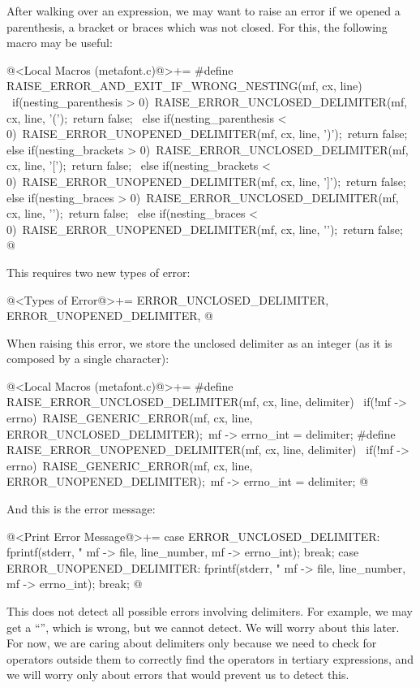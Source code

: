 After walking over an expression, we may want to raise an error if we
opened a parenthesis, a bracket or braces which was not closed. For
this, the following macro may be useful:

\iniciocodigo
@<Local Macros (metafont.c)@>+=
#define RAISE_ERROR_AND_EXIT_IF_WRONG_NESTING(mf, cx, line) {\
  if(nesting_parenthesis > 0){\
    RAISE_ERROR_UNCLOSED_DELIMITER(mf, cx, line, '(');\
    return false;\
  } else if(nesting_parenthesis < 0){\
    RAISE_ERROR_UNOPENED_DELIMITER(mf, cx, line, ')');\
    return false;\
  } else if(nesting_brackets > 0){\
    RAISE_ERROR_UNCLOSED_DELIMITER(mf, cx, line, '[');\
    return false;\
  } else if(nesting_brackets < 0){\
    RAISE_ERROR_UNOPENED_DELIMITER(mf, cx, line, ']');\
    return false;\
  } else if(nesting_braces > 0){\
    RAISE_ERROR_UNCLOSED_DELIMITER(mf, cx, line, '{');\
    return false;\
  } else if(nesting_braces < 0){\
    RAISE_ERROR_UNOPENED_DELIMITER(mf, cx, line, '}');\
    return false;}}
@
\fimcodigo

This requires two new types of error:

\iniciocodigo
@<Types of Error@>+=
ERROR_UNCLOSED_DELIMITER, ERROR_UNOPENED_DELIMITER,
@
\fimcodigo

When raising this error, we store the unclosed delimiter as an integer
(as it is composed by a single character):

\iniciocodigo
@<Local Macros (metafont.c)@>+=
#define RAISE_ERROR_UNCLOSED_DELIMITER(mf, cx, line, delimiter) {\
  if(!mf -> errno){\
    RAISE_GENERIC_ERROR(mf, cx, line, ERROR_UNCLOSED_DELIMITER);\
    mf -> errno_int = delimiter;}}
#define RAISE_ERROR_UNOPENED_DELIMITER(mf, cx, line, delimiter) {\
  if(!mf -> errno){\
    RAISE_GENERIC_ERROR(mf, cx, line, ERROR_UNOPENED_DELIMITER);\
    mf -> errno_int = delimiter;}}
@
\fimcodigo

And this is the error message:

\iniciocodigo
@<Print Error Message@>+=
case ERROR_UNCLOSED_DELIMITER:
  fprintf(stderr, "%
          mf -> file, line_number, mf -> errno_int);
  break;
case ERROR_UNOPENED_DELIMITER:
  fprintf(stderr, "%
          mf -> file, line_number, mf -> errno_int);
  break;
@
\fimcodigo

This does not detect all possible errors involving delimiters. For
example, we may get a ``\monoespaco{($\{$)$\}$}'', which is wrong, but
we cannot detect. We will worry about this later. For now, we are
caring about delimiters only because we need to check for operators
outside them to correctly find the operators in tertiary expressions,
and we will worry only about errors that would prevent us to detect
this.

